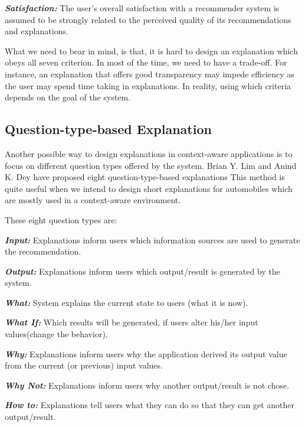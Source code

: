         \indent \textbf{\textit{Satisfaction:}} The user’s overall satisfaction with a recommender system is assumed to be 
        strongly related to the perceived quality of its recommendations and explanations\cite{swearingen2002interaction}.
 
        \indent What we need to bear in mind, is that, it is hard to design an explanation which
         obeys all seven criterion. In most of the time, we need to have a trade-off. For instance, an explanation that
        offers good transparency may impede efficiency as the user may spend time taking in explanations\cite{tintarev2007survey}.
        In reality, using which criteria depends on the goal of the system. 
    \subsection{Question-type-based Explanation}

    \indent Another possible way to design explanations in context-aware applications is to focus on different question types
    offered by the system. Brian Y. Lim and Anind K. Dey have proposed eight question-type-based explanations\cite{lim2010toolkit}
    This method is quite useful when we intend to design short explanations for automobiles which are mostly used in a context-aware environment.

    These eight question types are:

    \indent \textbf{\textit{Input:}} Explanations inform users which information sources are used to generate the recommendation.

    \indent \textbf{\textit{Output:}} Explanations inform users which output/result is generated by the system.

    \indent \textbf{\textit{What:}} System explains the current state to users (what it is now).

    \indent \textbf{\textit{What If:}} Which results will be generated, if users alter his/her input values(change the behavior).

    \indent \textbf{\textit{Why:}} Explanations inform users why the application derived its output value from the current (or previous) input values\cite{lim2010toolkit}.
    
    \indent \textbf{\textit{Why Not:}} Explanations inform users why another output/result is not chose.
    
    \indent \textbf{\textit{How to:}} Explanations tell users what they can do so that they can get another output/result.

